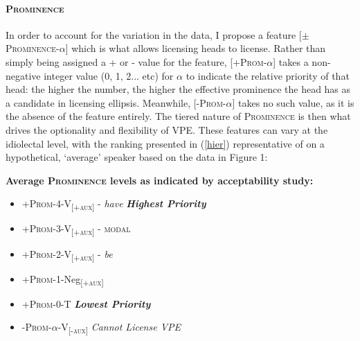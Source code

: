 \documentclass[11pt, oneside]{article}
\begin{document}
\paragraph{\textsc{Prominence}} In order to account for the variation in the data, I propose a feature [$\pm$\textsc{Prominence}-$\alpha$] which is what allows licensing heads to license. Rather than simply being assigned a + or - value for the feature, [+\textsc{Prom}-$\alpha$] takes a non-negative integer value (0, 1, 2... etc) for $\alpha$ to indicate the relative priority of that head: the higher the number, the higher the effective prominence the head has as a candidate in licensing ellipsis. Meanwhile, [-\textsc{Prom}-$\alpha$] takes no such value, as it is the absence of the feature entirely. The tiered nature of \textsc{Prominence} is then what drives the optionality and flexibility of VPE. These features can vary at the idiolectal level, with the ranking presented in (\ref{hier}) representative of on a hypothetical, `average' speaker based on the data in Figure 1:

\begin{exe}
\ex\label{hier} \textbf{Average \textsc{Prominence} levels as indicated by acceptability study:}\samepage	\begin{itemize}
	\item \textsc{+Prom-4}\tabto{1in}-\hspace{.5cm}V\textsubscript{\textsc{[+aux]}} - \textit{have} \tabto{3in}\textbf{\textit{Highest Priority}}
	\item \textsc{+Prom-3}\tabto{1in}-\hspace{.5cm}V\textsubscript{\textsc{[+aux]}} - \textsc{modal}
	\item \textsc{+Prom-2}\tabto{1in}-\hspace{.5cm}V\textsubscript{\textsc{[+aux]}} - \textit{be}
	\item \textsc{+Prom-1}\tabto{1in}-\hspace{.5cm}Neg\textsubscript{\textsc{[+aux]}}
	\item \textsc{+Prom-0}\tabto{1in}-\hspace{.5cm}T \tabto{3in} \textbf{\textit{Lowest Priority}}
	\item \textsc{-Prom-}$\alpha$\tabto{1in}-\hspace{.5cm}V\textsubscript{\textsc{[-aux]}} \tabto{3in} \textit{Cannot License VPE}
	\end{itemize}
\end{exe}
\end{document}
